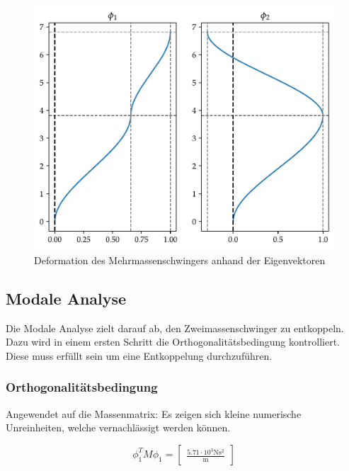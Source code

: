 \documentclass[
  letterpaper,
  DIV=11]{scrreprt}
\begin{document}
\begin{figure}[H]

{\centering \includegraphics{index_files/mediabag/mms_06_files/figure-pdf/fig-eigenvektoren-output-1.pdf}

}

\caption{\label{fig-eigenvektoren}Deformation des Mehrmassenschwingers
anhand der Eigenvektoren}

\end{figure}

\hypertarget{modale-analyse-3}{%
\subsection{Modale Analyse}\label{modale-analyse-3}}

Die Modale Analyse zielt darauf ab, den Zweimassenschwinger zu
entkoppeln. Dazu wird in einem ersten Schritt die
Orthogonalitätsbedingung kontrolliert. Diese muss erfüllt sein um eine
Entkoppelung durchzuführen.

\hypertarget{orthogonalituxe4tsbedingung-4}{%
\subsubsection{Orthogonalitätsbedingung}\label{orthogonalituxe4tsbedingung-4}}

Angewendet auf die Massenmatrix: Es zeigen sich kleine numerische
Unreinheiten, welche vernachlässigt werden können.

\begin{equation}\phi_{1}^{T} M \phi_{1} = \left[\begin{matrix}\frac{5.71 \cdot 10^{3} \text{N} \text{s}^{2}}{\text{m}}\end{matrix}\right]\end{equation}
\end{document}
